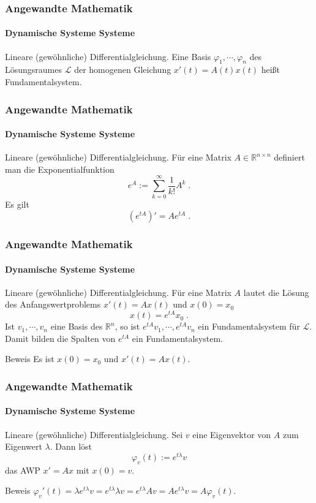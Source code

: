 \documentclass{beamer}
\begin{document}
\begin{frame}
    \frametitle{Angewandte Mathematik}
\framesubtitle{Dynamische Systeme Systeme}
\begin{block}{Lineare (gewöhnliche) Differentialgleichung.}
Eine Basis  $\varphi_1, \cdots, \varphi_n$ des Lösungsraumes $\mathcal{L}$ der homogenen Gleichung $x'(t) = A(t)x(t)$ heißt Fundamentalsystem.
\end{block}

 \end{frame}

\begin{frame}
    \frametitle{Angewandte Mathematik}
\framesubtitle{Dynamische Systeme Systeme}
\begin{block}{Lineare (gewöhnliche) Differentialgleichung.}
Für eine Matrix $A \in \mathbb{R}^{n \times n}$ definiert man die Exponentialfunktion 
$$  e^{ A}  := \sum_{k= 0}^{\infty} \frac{1}{k!} A^k \; .$$
Es gilt  
$$  (e^{ tA})' = A e^{tA}  \; .$$
\end{block}

 \end{frame}

\begin{frame}
    \frametitle{Angewandte Mathematik}
\framesubtitle{Dynamische Systeme Systeme}
\begin{block}{Lineare (gewöhnliche) Differentialgleichung.}
Für eine Matrix $A$ lautet die Lösung des Anfangswertproblems $x'(t) = Ax(t)$ und $x(0) = x_0$
$$ x(t) = e^{tA} x_0 \;.$$ Ist $v_1, \cdots , v_n$ eine Basis des $\mathbb{R}^n$, so ist $e^{tA}v_1, \cdots , e^{tA}v_n$ ein Fundamentalsystem für $\mathcal{L}$. Damit bilden die Spalten von  $e^{tA}$ ein Fundamentalsystem.
\end{block}

\begin{block}{Beweis}
Es ist $x(0) = x_0$ und $x'(t)= A x(t)$. 
\end{block}
 \end{frame}


\begin{frame}
    \frametitle{Angewandte Mathematik}
\framesubtitle{Dynamische Systeme Systeme}
\begin{block}{Lineare (gewöhnliche) Differentialgleichung.}
Sei $v$ eine Eigenvektor von $A$ zum Eigenwert $\lambda$. Dann löst 
$$ \varphi_v(t) := e^{t \lambda} v$$ das AWP $x' = Ax$ mit $x(0) = v$.

\end{block}
\begin{block}{Beweis}
$\varphi_v'(t) =  \lambda  e^{t \lambda}  v =  e^{t\lambda}  \lambda v =  e^{t\lambda}  A v  = A e^{t\lambda}   v  = A  \varphi_v(t)$.

\end{block}
 \end{frame}
\end{document}
